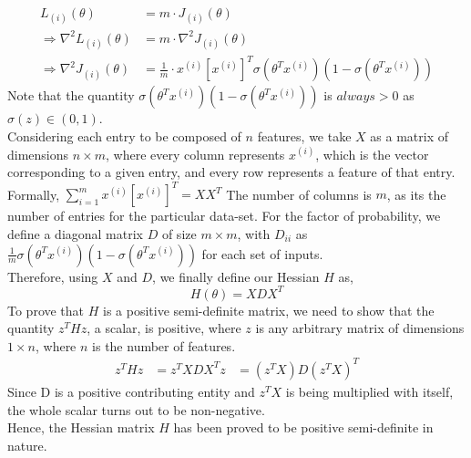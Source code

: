 \documentclass[12pt]{article}
\begin{document}
\begin{flushleft}
\begin{equation}
\begin{aligned}
L_{(i)}(\theta)&=m\cdot J_{(i)}(\theta)\\
\Rightarrow {\nabla}^2L_{(i)}(\theta)&=m\cdot{\nabla}^2 J_{(i)}(\theta)\\
\Rightarrow {\nabla}^2J_{(i)}(\theta)&=
\frac{1}{m}\cdot x^{(i)}[x^{(i)}]^T\sigma(\theta^T x^{(i)})(1-\sigma(\theta^T x^{(i)}))
\end{aligned}
\end{equation}
Note that the quantity $\sigma(\theta^T x^{(i)})(1-\sigma(\theta^T x^{(i)}))$ is $always >0$ as $\sigma(z)\in(0,1)$.\\
\vspace{6mm}
Considering each entry to be composed of $n$ features, we take $X$ as a matrix of dimensions $n\times m$, where every column represents $x^{(i)}$, which is the vector corresponding to a given entry, and every row represents a feature of that entry. Formally, $\sum_{i=1}^{m}x^{(i)}[x^{(i)}]^T=XX^T$ The number of columns is $m$, as its the number of entries for the particular data-set. For the factor of probability, we define a diagonal matrix $D$ of size $m\times m$, with $D_{ii}$ as $\frac{1}{m}\sigma(\theta^T x^{(i)})(1-\sigma(\theta^T x^{(i)}))$ for each set of inputs.\\
\vspace{6mm}
Therefore, using $X$ and $D$, we finally define our Hessian  $H$ as,
\begin{equation}
    H(\theta)=XDX^T
\end{equation}
To prove that $H$ is a positive semi-definite matrix, we need to show that the quantity $z^THz$, a scalar, is positive, where $z$ is any arbitrary matrix of dimensions $1\times n$, where $n$ is the number of features.
\begin{equation}
\begin{aligned}
z^THz&=z^TXDX^Tz&=(z^TX)D(z^TX)^T
\end{aligned}
\end{equation}
Since D is a positive contributing entity and $z^TX$ is being multiplied with itself, the whole scalar turns out to be non-negative.\\
\vspace{10mm}
Hence, the Hessian matrix $H$ has been proved to be positive semi-definite in nature.
\end{flushleft}
\end{document}
